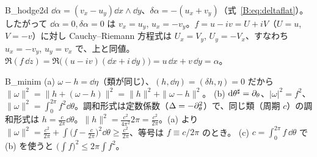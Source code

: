 \begin{soll}{B_hodge2d}
$\dd\alpha=(v_x-u_y)\dd x\wedge\dd y$、$\delta\alpha=-(u_x+v_y)$（式~\eqref{B:eq:deltaflat}）。したがって $\dd\alpha=0,\delta\alpha=0$ は $v_x=u_y$, $u_x=-v_y$。$f=u-iv=U+iV$（$U=u$, $V=-v$）に対し Cauchy--Riemann 方程式は $U_x=V_y$, $U_y=-V_x$、すなわち $u_x=-v_y$, $u_y=v_x$ で、上と同値。$\Re(f\,\dd z)=\Re\bigl((u-iv)(\dd x+i\,\dd y)\bigr)=u\,\dd x+v\,\dd y=\alpha$。
\end{soll}

\begin{soll}{B_minim}
(a) $\omega-h=\dd\eta$（類が同じ）、$(h,\dd\eta)=(\delta h,\eta)=0$ だから $\|\omega\|^2=\|h+(\omega-h)\|^2=\|h\|^2+\|\omega-h\|^2$。
(b) $\mathrm{d}\theta^\sharp=\partial_\theta$、$|\omega|^2=f^2$、$\|\omega\|^2=\int_0^{2\pi}f^2\dd\theta$。調和形式は定数係数（$\Delta=-\partial_\theta^2$）で、同じ類（周期 $c$）の調和形式は $h=\frac c{2\pi}\dd\theta$。$\|h\|^2=\frac{c^2}{4\pi^2}2\pi=\frac{c^2}{2\pi}$。(a) より $\|\omega\|^2=\frac{c^2}{2\pi}+\int\bigl(f-\frac c{2\pi}\bigr)^2\dd\theta\ge\frac{c^2}{2\pi}$、等号は $f\equiv c/2\pi$ のとき。
(c) $c=\int_0^{2\pi}f\,\dd\theta$ で (b) を使うと $\bigl(\int f\bigr)^2\le2\pi\int f^2$。
\end{soll}
